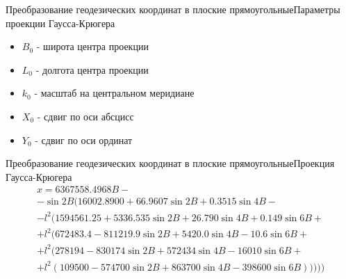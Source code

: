\documentclass[aspectratio=43]{beamer}
\begin{document}
\begin{frame}{Преобразование геодезических координат в плоские прямоугольные}{Параметры проекции Гаусса-Крюгера}
\begin{itemize}
\item $B_0$ - широта центра проекции
\item $L_0$ - долгота центра проекции
\item $k_0$ - масштаб на центральном меридиане
\item $X_0$ - сдвиг по оси абсцисс
\item $Y_0$ - сдвиг по оси ординат
\end{itemize}
\end{frame}

\begin{frame}{Преобразование геодезических координат в плоские прямоугольные}{Проекция Гаусса-Крюгера}
\begin{multline}\nonumber
x = 6367558.4968 B -\\- \sin 2B (16002.8900 + 66.9607 \sin2 B + 0.3515 \sin4 B -\\
-l^2 (1594561.25 + 5336.535 \sin2 B + 26.790 \sin4 B + 0.149 \sin6 B +\\
+ l^2 (672483.4 - 811219.9 \sin2 B + 5420.0 \sin4 B - 10.6 \sin6 B +\\
+ l^2 (278194 - 830174 \sin2 B + 572434 \sin4 B - 16010 \sin6 B +\\
+ l^2 (109500 - 574700 \sin2 B + 863700 \sin4 B - 398600 \sin6 B)))))
\end{multline}
\end{frame}
\end{document}
